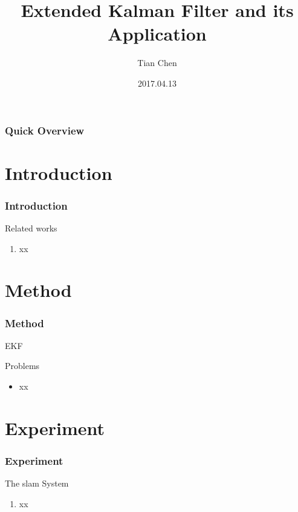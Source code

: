 \documentclass[14pt,hyperref={CJKbookmarks=true}]{beamer}
\theoremstyle{plain}
\theoremstyle{definition}
\theoremstyle{remark}
\begin{document}
\title[IACAS]{Extended Kalman Filter and its Application}
\author{Tian Chen}
\date[]{2017.04.13}
\begin{frame}
\titlepage
\end{frame}


\begin{frame}
\frametitle{Quick Overview} 
\large\tableofcontents
\end{frame}

\section{Introduction}
\begin{frame}
\frametitle{Introduction} 
\small
\begin{block}{Related works}

\begin{enumerate}
\item xx
\end{enumerate}
\end{block}


\end{frame}



\section{Method}

\begin{frame}
\small
\frametitle{Method}{EKF}
\begin{block}{Problems}
\begin{itemize}
\item xx
\end{itemize}
\end{block}
\end{frame}


\section{Experiment}
\begin{frame}
\frametitle{Experiment}
\begin{block}{The slam System}
\begin{enumerate}
\item xx
\end{enumerate}
\end{block}
\end{frame}
\end{document}
